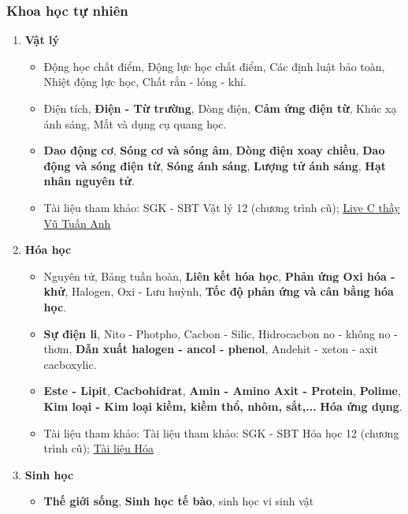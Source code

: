 \subsubsection{Khoa học tự nhiên}
\begin{enumerate}
    \item \textbf{Vật lý}
    \begin{itemize}
        \item Động học chất điểm, Động lực học chất điểm, Các định luật bảo toàn, Nhiệt động lực học, Chất rắn - lỏng - khí.
        \item Điện tích, \textbf{Điện - Từ trường}, Dòng điện, \textbf{Cảm ứng điện từ}, Khúc xạ ánh sáng, Mắt và dụng cụ quang học.
        \item \textbf{Dao động cơ}, \textbf{Sóng cơ và sóng âm}, \textbf{Dòng điện xoay chiều}, \textbf{Dao động và sóng điện từ}, \textbf{Sóng ánh sáng}, \textbf{Lượng tử ánh sáng}, \textbf{Hạt nhân nguyên tử}.
        \item Tài liệu tham khảo: SGK - SBT Vật lý 12 (chương trình cũ); \href{https://drive.google.com/drive/folders/1DDyPLypeOzVWsB3-JPDBNBk8See7p6g8}{Live C thầy Vũ Tuấn Anh}
    \end{itemize}
    \item \textbf{Hóa học}
    \begin{itemize}
        \item Nguyên tử, Bảng tuần hoàn, \textbf{Liên kết hóa học}, \textbf{Phản ứng Oxi hóa - khử}, Halogen, Oxi - Lưu huỳnh, \textbf{Tốc độ phản ứng và cân bằng hóa học}. 
        \item \textbf{Sự điện li}, Nito - Photpho, Cacbon - Silic, Hidrocacbon no - không no - thơm, \textbf{Dẫn xuất halogen - ancol - phenol}, Andehit - xeton - axit cacboxylic.
        \item \textbf{Este - Lipit}, \textbf{Cacbohidrat}, \textbf{Amin - Amino Axit - Protein}, \textbf{Polime}, \textbf{Kim loại - Kim loại kiềm, kiềm thổ, nhôm, sắt,...} \textbf{Hóa ứng dụng}.
        \item Tài liệu tham khảo: Tài liệu tham khảo: SGK - SBT Hóa học 12 (chương trình cũ); \href{https://drive.google.com/drive/folders/1ZuWHtl1ARV1sRz00ZvF_XRskvD9ggg_1}{Tài liệu Hóa}
    \end{itemize}
    \item \textbf{Sinh học}
    \begin{itemize}
        \item \textbf{Thế giới sống}, \textbf{Sinh học tế bào}, sinh học vi sinh vật
        \begin{itemize}

\end{itemize}
\end{itemize}
\end{enumerate}
